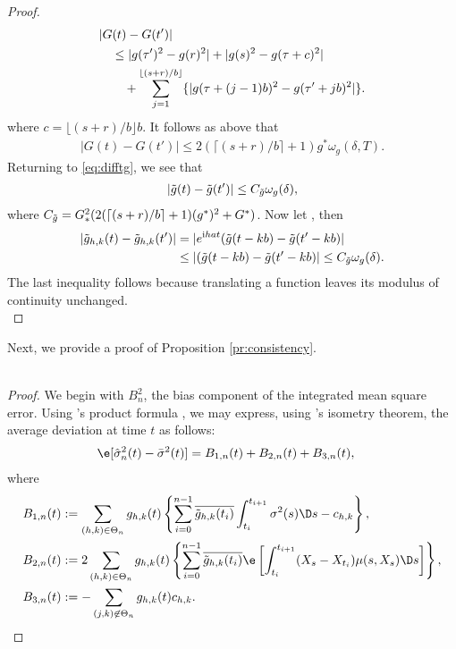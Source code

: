 \begin{appendices}
\begin{proof}
\begin{align}
  &\vert G(t) - G(t') \vert \notag \\
  &\quad \le \vert g(\tau')^2 - g(r)^2\vert +   \vert g(s)^2 - g(\tau + c)^2 \vert\notag \\
  &\qquad +\sum_{j = 1}^{\lfloor (s + r)/b \rfloor} \{\vert g(\tau + (j-1) b)^2 - g(\tau' + j b)^2\vert\}.  \notag
  \label{}
\end{align}
where $c = \lfloor (s + r)/b \rfloor b $. It follows as above that 
\begin{align}
\vert G(t) - G(t') \vert \le 2 (\lceil (s + r)/b\rceil +1)g^*\omega_g(\delta, T).
\end{align}
Returning to \eqref{eq:difftg}, we see that
\begin{align}
  \vert \tilde{g}(t) - \tilde{g}(t')\vert \le C_{\tilde{g}} \omega_g(\delta),\notag
  \label{}
\end{align}
where $C_{\tilde{g}} = G_*^2(2 (\lceil (s + r)/b\rceil +1)(g^*)^2 + G^*)$. Now let \hkints, then
\begin{align}
  \vert \tilde{g}_{h,k}(t) - \tilde{g}_{h,k}(t')\vert & = \vert e^{\mathrm{i} h a t} (\tilde{g}(t - kb) -\tilde{g}(t'-kb) \vert\notag\\
  &\le \vert (\tilde{g}(t - kb) -\tilde{g}(t'-kb) \vert \le C_{\tilde{g}} \omega_g(\delta).
  \label{}
\end{align}
The last inequality follows because translating a function leaves its modulus of continuity unchanged.\\
\end{proof}
Next, we provide a proof of Proposition \eqref{pr:consistency}. \\\\
\begin{proof}
  We begin with $B^2_n$, the bias component of the integrated mean square error. Using \ito's product formula \citep[p. 257]{Applebaum2009}, we may express, using \ito's isometry theorem, the average deviation at time $t$ as follows:
\begin{align}
  &\e[\svn(t) - \bsv(t)] = B_{1,n}(t) + B_{2,n}(t) + B_{3,n}(t), \notag
\end{align}
where
\begin{align}
  &B_{1,n}(t) :=  \sumt g_{h,k}(t) \left\{\sum_{i=0}^{n-1} \btghki \int_{t_i}^{t_{i+1}}\sigma^2(s) \D s -\chk\right\}, \notag\\
  &B_{2,n}(t) := 2 \sumt g_{h,k}(t)\left\{ \sum_{i=0}^{n-1} \btghki \e\left[\int_{t_i}^{t_{i+1}}(X_s - X_{t_i}) \mu(s,X_s) \D s\right] \right\}, \notag\\
  &B_{3,n}(t) := - \sum_{\substack{(j,k) \not\in \Theta_n }}g_{h,k}(t)\chk. 

\end{align}
\end{proof}
\end{appendices}

